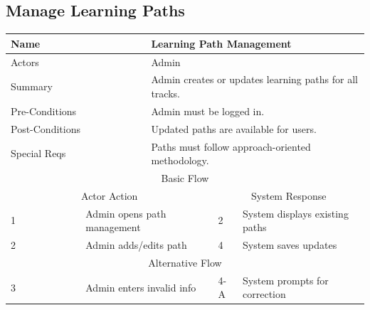 \documentclass{FastFyp}
\begin{document}
\subsection{Manage Learning Paths}
\noindent
\begin{minipage}{\textwidth}
\centering
{}
\label{tab:learningpath}
\begin{tabular}{|p{}|p{}|p{}|p{}|p{}|}
\hline
\multicolumn{2}{|p{0.15\textwidth}|}{Name} &
  \multicolumn{3}{p{0.75\textwidth}|}{Learning Path Management} \\ \hline
\multicolumn{2}{|p{0.15\textwidth}|}{Actors} &
  \multicolumn{3}{p{0.75\textwidth}|}{Admin} \\ \hline
\multicolumn{2}{|p{0.15\textwidth}|}{Summary} &
  \multicolumn{3}{p{0.75\textwidth}|}{Admin creates or updates learning paths for all tracks.} \\ \hline
\multicolumn{2}{|p{0.15\textwidth}|}{Pre-Conditions} &
  \multicolumn{3}{p{0.75\textwidth}|}{Admin must be logged in.} \\ \hline
\multicolumn{2}{|p{0.15\textwidth}|}{Post-Conditions} &
  \multicolumn{3}{p{0.75\textwidth}|}{Updated paths are available for users.} \\ \hline
\multicolumn{2}{|p{0.15\textwidth}|}{Special Reqs} &
  \multicolumn{3}{p{0.75\textwidth}|}{Paths must follow approach-oriented methodology.} \\ \hline
\multicolumn{5}{|c|}{Basic Flow} \\ \hline
\multicolumn{3}{|c|}{Actor Action} &
  \multicolumn{2}{c|}{System Response} \\ \hline
1 &
  \multicolumn{2}{p{0.42\textwidth}|}{Admin opens path management} &
  2 &
  System displays existing paths \\ \hline
2 &
  \multicolumn{2}{p{0.42\textwidth}|}{Admin adds/edits path} &
  4 &
  System saves updates \\ \hline
\multicolumn{5}{|c|}{Alternative Flow} \\ \hline
3 &
  \multicolumn{2}{p{0.42\textwidth}|}{Admin enters invalid info} &
  4-A &
  System prompts for correction \\ \hline
\end{tabular}
\end{minipage}

\vspace{1em}
\end{document}
